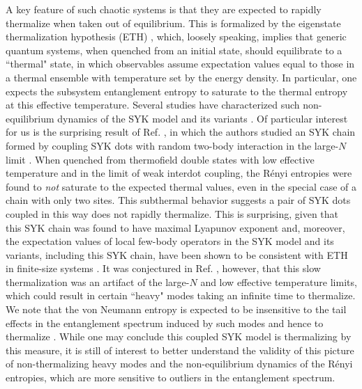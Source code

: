 \documentclass[reprint, floatfix,eqsecnum,superscriptaddress,preprint,nofootinbib,onecolumn,amsmath,amssymb,aps,prb]{revtex4-2}
\begin{document}
A key feature of such chaotic systems is that they are expected to rapidly thermalize when taken out of equilibrium.
This is formalized by the eigenstate thermalization hypothesis (ETH) \cite{Deutsch1991,Srednicki1994,DAlessio2016}, which, loosely speaking, implies that generic quantum systems, when quenched from an initial state, should equilibrate to a ``thermal" state, in which observables assume expectation values equal to those in a thermal ensemble with temperature set by the energy density. In particular, one expects the subsystem entanglement entropy to saturate to the thermal entropy at this effective temperature. Several studies have characterized such non-equilibrium dynamics of the SYK model and its variants \cite{Eberlein2017,Gu2017b,almheiri2019universal,Chen2020,Zhang2020b,Liu2018,Zhang2019,Bhattacharya2019,Haldar2020,Jian2021,Samui2021,Larzul2021}. Of particular interest for us is the surprising result of Ref. \cite{Gu2017b}, in which the authors %
studied an SYK chain formed by coupling SYK dots with random two-body interaction in the large-$N$ limit \cite{Gu2017a}.
When quenched from thermofield double states with low effective temperature and in the limit of weak interdot coupling, the R\'enyi entropies were found to \emph{not} saturate to the expected thermal values, even in the special case of a chain with only two sites. This subthermal behavior suggests a pair of SYK dots coupled in this way does not rapidly thermalize. This is surprising, given that this SYK chain was found to have maximal Lyapunov exponent \cite{Gu2017a} and, moreover, the expectation values of local few-body operators in the SYK model and its variants, including this SYK chain, have been shown to be consistent with ETH in finite-size systems \cite{Sonner2017,HunterJones2018,Halataei2021}. It was conjectured in Ref. \cite{Gu2017b}, however, that this slow thermalization was an artifact of the large-$N$ and low effective temperature limits, which could result in certain ``heavy" modes taking an infinite time to thermalize. We note that the von Neumann entropy is expected to be insensitive to the tail effects in the entanglement spectrum induced by such modes and hence to thermalize \cite{Penington2019}. While one may conclude this coupled SYK model is thermalizing by this measure, it is still of interest to better understand the validity of this picture of non-thermalizing heavy modes and the non-equilibrium dynamics of the R\'enyi entropies, which are more sensitive to outliers in the entanglement spectrum.
\end{document}
